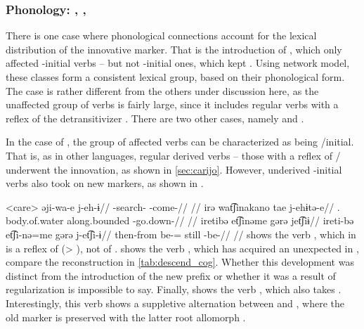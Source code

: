 \subsubsection{Phonology: \akuriyo, \carijo, \yukpa}
\label{sec:phonology}
There is one case where phonological connections account for the lexical distribution of the innovative marker.
That is the introduction of \akuriyo {}, which only affected -initial verbs -- but not -initial ones, which kept  .
Using  network model, these classes form a consistent lexical group, based on their phonological form.
The \akuriyo case is rather different from the others under discussion here, as the unaffected group of verbs is fairly large, since it includes regular  verbs with a reflex of the detransitivizer .
There are two other cases, namely \carijo {}  and \yukpa {} .

In the case of \carijo, the group of affected verbs can be characterized as being /initial.
That is, as in other languages, regular derived  verbs -- those with a reflex of / underwent the innovation, as shown in \cref{sec:carijo}.
However, underived -initial  verbs also took on new markers, as shown in .

\pex<care>\carijo
{}
\begingl
\gla əji-wa-e j-eh-ɨ//
\glb {}-search- -come-//
\glft {} \parencite[][102]{guerrero2019carijo}//
\endgl
{}
\begingl
\gla irə wat͡ʃinakano tae j-ehɨtə-e//
\glb {}. body.of.water along.bounded -go.down-//
\glft {} //
\endgl
{}
\begingl
\glpreamble iretibə et͡ʃinəme gərə jet͡ʃiɨ//
\gla ireti-bə et͡ʃi-nə=me gərə j-et͡ʃi-ɨ//
\glb then-from be-= still -be-//
\glft {} \parencite[][177]{robayo1989rame}//
\endgl
\xe
%
 shows the verb , which in \carijo is a reflex of  (> ), not of .
 shows the verb , which has acquired an unexpected  in \carijo, compare the reconstruction in \cref{tab:descend_cog}.
Whether this development was distinct from the introduction of the new prefix  or whether it was a result of regularization is impossible to say.
Finally,  shows the verb  , which also takes .
Interestingly, this verb shows a suppletive alternation between  and , where the old marker  is preserved with the latter root allomorph .

